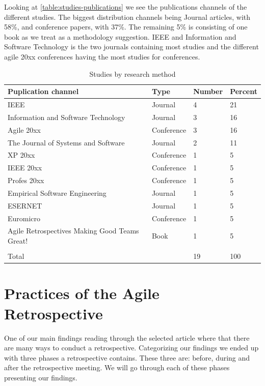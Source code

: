 \documentclass[12pt]{article}
\begin{document}
Looking at \autoref{table:studies-publications} we see the publications channels of the different studies. The biggest distribution channels being Journal articles, with 58\%, and conference papers, with 37\%. The remaining 5\% is consisting of one book as we treat as a methodology suggestion. IEEE and Information and Software Technology is the two journals containing most studies and the different agile 20xx conferences having the most studies for conferences. 

\begin{table}[!h]
	\centering
	\caption{Studies by research method}
	\label{table:studies-publications}
	\begin{tabular}{ p{} p{} p{} p{}}
		\hline
		Puplication channel & Type & Number & Percent \\ \hline
		IEEE & Journal & 4 & 21 \\
		Information and Software Technology & Journal & 3 & 16 \\
		Agile 20xx & Conference & 3 & 16 \\
		The Journal of Systems and Software & Journal & 2 & 11 \\
		XP 20xx & Conference & 1 & 5 \\
		IEEE  20xx & Conference & 1 & 5 \\
		Profes 20xx & Conference & 1 & 5 \\
		Empirical Software Engineering & Journal & 1 & 5 \\
		ESERNET & Journal & 1 & 5 \\
		Euromicro & Conference & 1 & 5 \\
		Agile Retrospectives Making Good Teams Great! & Book & 1 & 5 \\
		\\
		Total & & 19 & 100 \\ \hline
	\end{tabular}
\end{table}

\section{Practices of the Agile Retrospective}
One of our main findings reading through the selected article where that there are many ways to conduct a retrospective. Categorizing our findings we ended up with three phases a retrospective contains. These three are: before, during and after the retrospective meeting. We will go through each of these phases presenting our findings.
\end{document}

